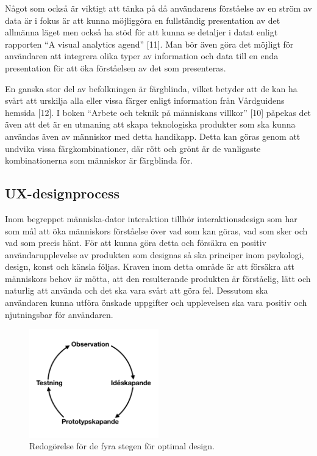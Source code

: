 \documentclass[12pt]{kththesis}
\begin{document}
Något som också är viktigt att tänka på då användarens förståelse av en ström av data är i fokus är att kunna möjliggöra en fullständig presentation av det allmänna läget men också ha stöd för att kunna se detaljer i datat enligt rapporten “A visual analytics agend” [11]. Man bör även göra det möjligt för användaren att integrera olika typer av information och data till en enda presentation för att öka förståelsen av det som presenteras.

En ganska stor del av befolkningen är färgblinda, vilket betyder att de kan ha svårt att urskilja alla eller vissa färger enligt information från Vårdguidens hemsida [12]. I boken “Arbete och teknik på människans villkor” [10] påpekas det även att det är en utmaning att skapa teknologiska produkter som ska kunna användas även av människor med detta handikapp. Detta kan göras genom att undvika vissa färgkombinationer, där rött och grönt är de vanligaste kombinationerna som människor är färgblinda för.


\subsection{UX-designprocess}


Inom begreppet människa-dator interaktion tillhör interaktionsdesign som har som mål att öka människors förståelse över vad som kan göras, vad som sker och vad som precis hänt. För att kunna göra detta och försäkra en positiv användarupplevelse av produkten som designas så ska principer inom psykologi, design, konst och känsla följas. Kraven inom detta område är att försäkra att människors behov är mötta, att den resulterande produkten är förståelig, lätt och naturlig att använda och det ska vara svårt att göra fel. Dessutom ska användaren kunna utföra önskade uppgifter och upplevelsen ska vara positiv och njutningsbar för användaren.                    

\captionsetup[figure]{name=Figur}

\begin{figure}[h]
\centering
\includegraphics[width=0.5\textwidth]{PrototypeCreation}
\caption{Redogörelse för de fyra stegen för optimal design.}
\end{figure}
\end{document}
